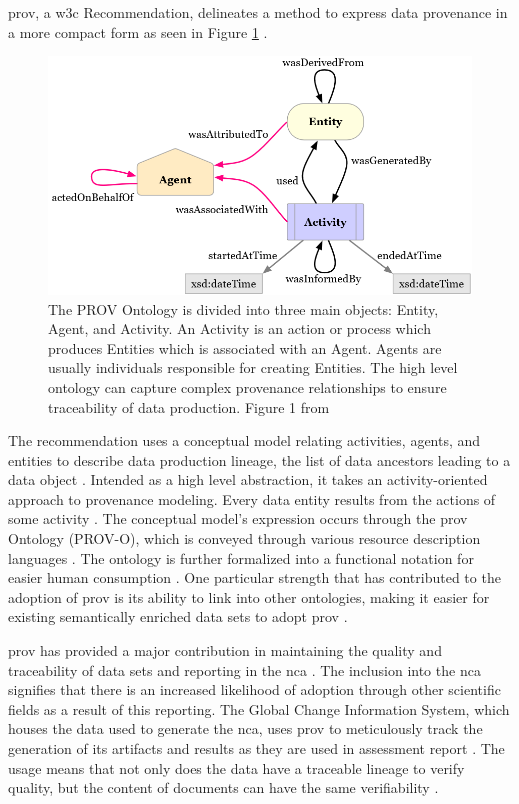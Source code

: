 \gls{prov}, a \gls{w3c} Recommendation, delineates a method to express data provenance in a more compact form as seen in Figure \ref{PROVO} \cite{Gil2013a} \cite{Groth2013}.
\begin{figure}
	\centering
	\includegraphics[scale=0.5]{figures/ProvO.png}
	\caption[Diagram of the PROV Ontology.]{The PROV Ontology is divided into three main objects: Entity, Agent, and Activity.  An Activity is an action or process which produces Entities which is associated with an Agent.  Agents are usually individuals responsible for creating Entities.  The high level ontology can capture complex provenance relationships to ensure traceability of data production.  Figure 1 from \cite{Lebo2013}}
	\label{PROVO}
\end{figure}
The recommendation uses a conceptual model relating activities, agents, and entities to describe data production lineage, the list of data ancestors leading to a data object \cite{Moreau2013c} \cite{Nies2013} \cite{Nies2013a}.
Intended as a high level abstraction, it takes an activity-oriented approach to provenance modeling.
Every data entity results from the actions of some activity \cite{Gil2013}.
The conceptual model's expression occurs through the \gls{prov} Ontology (PROV-O), which is conveyed through various resource description languages \cite{Hua2013} \cite{Klyne2013}.
The ontology is further formalized into a functional notation for easier human consumption \cite{Moreau2013b} \cite{Cheney2013a}.
One particular strength that has contributed to the adoption of \gls{prov} is its ability to link into other ontologies, making it easier for existing semantically enriched data sets to adopt \gls{prov} \cite{Miles2013} \cite{Moreau2013}.

\gls{prov} has provided a major contribution in maintaining the quality and traceability of data sets and reporting in the \gls{nca} \cite{Ma2014191}.
The inclusion into the \gls{nca} signifies that there is an increased likelihood of adoption through other scientific fields as a result of this reporting.
The Global Change Information System, which houses the data used to generate the \gls{nca}, uses \gls{prov} to meticulously track the generation of its artifacts and results as they are used in assessment report \cite{Tilmes2012}.
The usage means that not only does the data have a traceable lineage to verify quality, but the content of documents can have the same verifiability \cite{Ma2014}.

